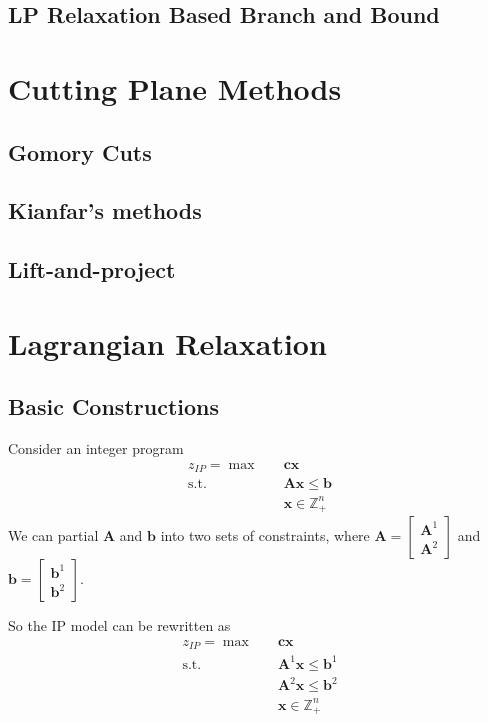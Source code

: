 			\section{LP Relaxation Based Branch and Bound}

		\chapter{Cutting Plane Methods}
			\section{Gomory Cuts}

			\section{Kianfar's methods}

			\section{Lift-and-project}

		\chapter{Lagrangian Relaxation}
			\section{Basic Constructions}
				Consider an integer program
				\begin{align*}
					z_{IP} = \max \quad & \mathbf{cx}\\
							\text{s.t.} \quad & \mathbf{Ax} \le \mathbf{b}\\
							&\mathbf{x} \in \mathbb{Z}_+^n
				\end{align*}
				We can partial $\mathbf{A}$ and $\mathbf{b}$ into two sets of constraints, where $\mathbf{A} = \begin{bmatrix}\mathbf{A}^1 \\ \mathbf{A}^2\end{bmatrix}$ and $\mathbf{b} = \begin{bmatrix}\mathbf{b}^1 \\ \mathbf{b}^2\end{bmatrix}$. 

				So the IP model can be rewritten as
				\begin{align*}
					z_{IP} = \max \quad & \mathbf{cx}\\
							\text{s.t.} \quad & \mathbf{A}^1 \mathbf{x} \le \mathbf{b}^1\\
											  & \mathbf{A}^2 \mathbf{x} \le \mathbf{b}^2\\
							&\mathbf{x} \in \mathbb{Z}_+^n
				\end{align*}

